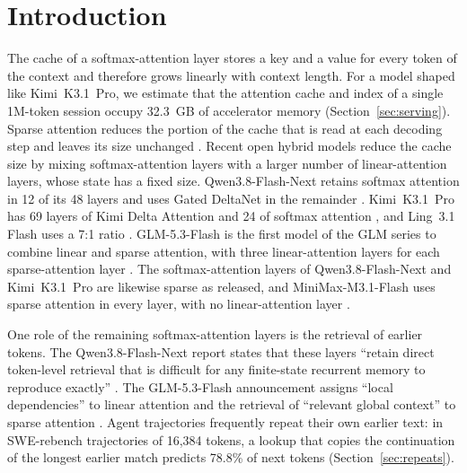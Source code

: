 \section{Introduction}
\label{sec:intro}

The cache of a softmax-attention layer stores a key and a value for every token of the context
\citep{vaswani2017} and therefore grows linearly with context length. For a model shaped like
Kimi~K3.1~Pro, we estimate that the attention cache and index of a single 1M-token session occupy
32.3~GB of accelerator memory (Section~\ref{sec:serving}). Sparse attention reduces the portion of
the cache that is read at each decoding step and leaves its size unchanged \citep{nemotron35}.
Recent open hybrid models reduce the cache size by mixing softmax-attention layers with a larger
number of linear-attention layers, whose state has a fixed size. Qwen3.8-Flash-Next retains
softmax attention in 12 of its 48 layers and uses Gated DeltaNet in the remainder
\citep{qwen38fn,qwen38fncard,yang2025gdn}. Kimi~K3.1~Pro has 69 layers of Kimi Delta Attention and 24 of softmax
attention \citep{kimik31,kimilinear}, and Ling~3.1 Flash uses a 7:1 ratio \citep{ling31flash}.
GLM-5.3-Flash is the first model of the GLM series to combine linear and sparse attention, with
three linear-attention layers for each sparse-attention layer \citep{glm53flash}. The
softmax-attention layers of Qwen3.8-Flash-Next and Kimi~K3.1~Pro are likewise sparse as released,
and MiniMax-M3.1-Flash uses sparse attention in every layer, with no linear-attention layer
\citep{minimaxm31flash}.

One role of the remaining softmax-attention layers is the retrieval of earlier tokens. The
Qwen3.8-Flash-Next report states that these layers ``retain direct token-level retrieval that is
difficult for any finite-state recurrent memory to reproduce exactly'' \citep{qwen38fn}. The
GLM-5.3-Flash announcement assigns ``local dependencies'' to linear attention and the retrieval
of ``relevant global context'' to sparse attention \citep{glm53flash}. Agent
trajectories frequently repeat their own earlier text: in SWE-rebench trajectories of 16,384
tokens, a lookup that copies the continuation of the longest earlier match predicts 78.8\% of next
tokens (Section~\ref{sec:repeats}).

